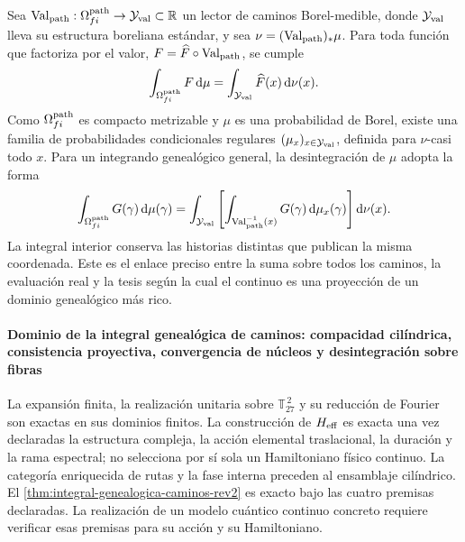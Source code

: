 Sea
\(\operatorname{Val}_{\rm path}:\Omega^{\rm path}_{fi}\to\mathcal Y_{\rm val}\subset\mathbb R\)
un lector de caminos Borel-medible, donde \(\mathcal Y_{\rm val}\) lleva su estructura
boreliana estándar, y sea
\(\nu=(\operatorname{Val}_{\rm path})_*\mu\). Para toda función que
factoriza por el valor, \(F=\widehat F\circ\operatorname{Val}_{\rm path}\),
se cumple
\[
 \int_{\Omega^{\rm path}_{fi}}F\,\mathrm d\mu
 =\int_{\mathcal Y_{\rm val}}\widehat F(x)\,\mathrm d\nu(x).
\]
Como \(\Omega^{\rm path}_{fi}\) es compacto metrizable y \(\mu\) es una
probabilidad de Borel, existe una familia de probabilidades condicionales
regulares \((\mu_x)_{x\in\mathcal Y_{\rm val}}\), definida para \(\nu\)-casi todo \(x\). Para
un integrando genealógico general, la desintegración de \(\mu\) adopta la forma
\begin{equation}
 \int_{\Omega^{\rm path}_{fi}}G(\gamma)\,\mathrm d\mu(\gamma)
 =\int_{\mathcal Y_{\rm val}}\left[
   \int_{\operatorname{Val}_{\rm path}^{-1}(x)}
   G(\gamma)\,\mathrm d\mu_x(\gamma)
  \right]\mathrm d\nu(x).
 \label{eq:desintegracion-genealogica-caminos-rev2}
\end{equation}
La integral interior conserva las historias distintas que publican la misma
coordenada. Este es el enlace preciso entre la suma sobre todos los caminos,
la evaluación real y la tesis según la cual el continuo es una proyección de
un dominio genealógico más rico.

\paragraph{Dominio de la integral genealógica de caminos: compacidad cilíndrica, consistencia proyectiva, convergencia de núcleos y desintegración sobre fibras}
La expansión finita, la realización unitaria sobre
\(\mathbb T_{27}^{\,2}\) y su reducción de Fourier son exactas en sus dominios
finitos. La construcción de \(H_{\rm eff}\) es
exacta una vez declaradas la estructura compleja, la acción elemental
traslacional, la duración y la rama espectral; no selecciona por sí sola un
Hamiltoniano físico continuo. La categoría enriquecida de rutas y la fase
interna preceden al ensamblaje cilíndrico. El
\cref{thm:integral-genealogica-caminos-rev2} es exacto bajo las cuatro
premisas declaradas. La realización de un modelo cuántico continuo concreto
requiere verificar esas premisas para su acción y su Hamiltoniano.
